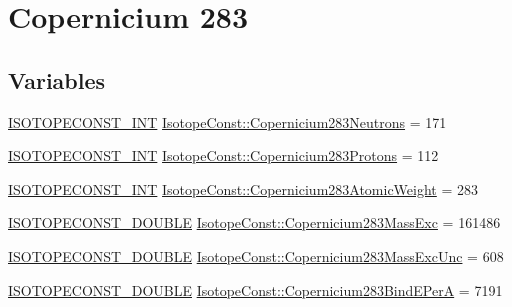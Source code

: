 \hypertarget{group___isotope_const-_copernicium-_cn283}{}\section{Copernicium 283}
\label{group___isotope_const-_copernicium-_cn283}
\subsection*{Variables}
\begin{DoxyCompactItemize}
\item 
\mbox{\hyperlink{group___isotope_const-_macros_ga5f18360b3e99483a35c32d789e62621c}{I\+S\+O\+T\+O\+P\+E\+C\+O\+N\+S\+T\+\_\+\+I\+NT}} \mbox{\hyperlink{group___isotope_const-_copernicium-_cn283_gac2b1a115e5390e6770220cb2483953ac}{Isotope\+Const\+::\+Copernicium283\+Neutrons}} = 171
\item 
\mbox{\hyperlink{group___isotope_const-_macros_ga5f18360b3e99483a35c32d789e62621c}{I\+S\+O\+T\+O\+P\+E\+C\+O\+N\+S\+T\+\_\+\+I\+NT}} \mbox{\hyperlink{group___isotope_const-_copernicium-_cn283_ga0c682c9dcb029a594dcd4fe19869f39d}{Isotope\+Const\+::\+Copernicium283\+Protons}} = 112
\item 
\mbox{\hyperlink{group___isotope_const-_macros_ga5f18360b3e99483a35c32d789e62621c}{I\+S\+O\+T\+O\+P\+E\+C\+O\+N\+S\+T\+\_\+\+I\+NT}} \mbox{\hyperlink{group___isotope_const-_copernicium-_cn283_ga2036d7cb39096d47da7e7fb48fffa395}{Isotope\+Const\+::\+Copernicium283\+Atomic\+Weight}} = 283
\item 
\mbox{\hyperlink{group___isotope_const-_macros_ga8f45a7272ce02c0b4c65c44636ed719a}{I\+S\+O\+T\+O\+P\+E\+C\+O\+N\+S\+T\+\_\+\+D\+O\+U\+B\+LE}} \mbox{\hyperlink{group___isotope_const-_copernicium-_cn283_gaa9781df5312060c5c72f2e3a3c1839e8}{Isotope\+Const\+::\+Copernicium283\+Mass\+Exc}} = 161486
\item 
\mbox{\hyperlink{group___isotope_const-_macros_ga8f45a7272ce02c0b4c65c44636ed719a}{I\+S\+O\+T\+O\+P\+E\+C\+O\+N\+S\+T\+\_\+\+D\+O\+U\+B\+LE}} \mbox{\hyperlink{group___isotope_const-_copernicium-_cn283_ga448b5c3b4922b4e1bca4ab7ba020a252}{Isotope\+Const\+::\+Copernicium283\+Mass\+Exc\+Unc}} = 608
\item 
\mbox{\hyperlink{group___isotope_const-_macros_ga8f45a7272ce02c0b4c65c44636ed719a}{I\+S\+O\+T\+O\+P\+E\+C\+O\+N\+S\+T\+\_\+\+D\+O\+U\+B\+LE}} \mbox{\hyperlink{group___isotope_const-_copernicium-_cn283_gac5bb7a19ffcc44ecf3b23b838dceaf57}{Isotope\+Const\+::\+Copernicium283\+Bind\+E\+PerA}} = 7191

\end{DoxyCompactItemize}
